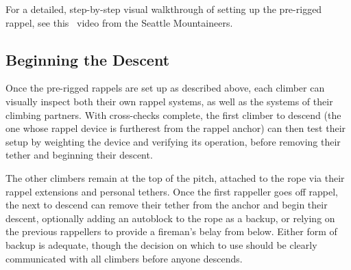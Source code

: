 \documentclass[nonacm,acmtog]{acmart}
\begin{document}
  For a detailed, step-by-step visual walkthrough of setting up the pre-rigged
  rappel, see this~\cite[time 4:55]{mountaineers:rappel-video} video from the
  Seattle Mountaineers.

\subsection{Beginning the Descent}

  Once the pre-rigged rappels are set up as described above, each climber can
  visually inspect both their own rappel systems, as well as the systems of
  their climbing partners.  With cross-checks complete, the first climber to
  descend (the one whose rappel device is furtherest from the rappel anchor)
  can then test their setup by weighting the device and verifying its operation,
  before removing their tether and beginning their descent.

  The other climbers remain at the top of the pitch, attached to the rope via
  their rappel extensions and personal tethers.  Once the first rappeller goes
  off rappel, the next to descend can remove their tether from the anchor and
  begin their descent, optionally adding an autoblock to the rope as a backup,
  or relying on the previous rappellers to provide a fireman's belay from
  below.  Either form of backup is adequate, though the decision on which to
  use should be clearly communicated with all climbers before anyone descends.



\end{document}
